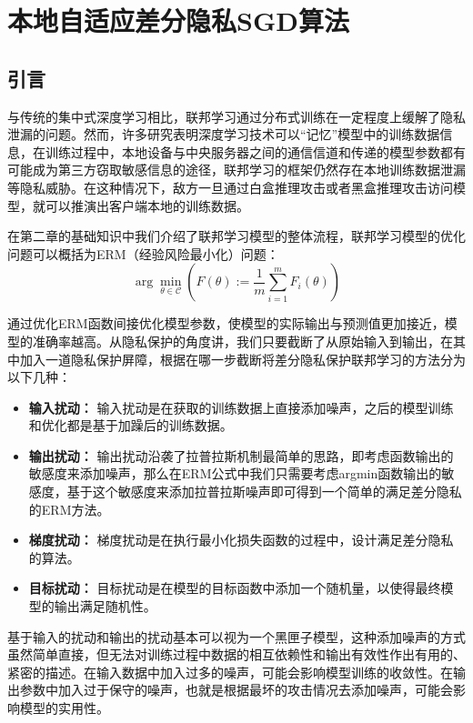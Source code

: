 \chapter{本地自适应差分隐私SGD算法}

\label{ch3}

\section{引言}
与传统的集中式深度学习相比，联邦学习通过分布式训练在一定程度上缓解了隐私泄漏的问题。然而，许多研究表明深度学习技术可以“记忆”模型中的训练数据信息，在训练过程中，本地设备与中央服务器之间的通信信道和传递的模型参数都有可能成为第三方窃取敏感信息的途径，联邦学习的框架仍然存在本地训练数据泄漏等隐私威胁。在这种情况下，敌方一旦通过白盒推理攻击或者黑盒推理攻击访问模型，就可以推演出客户端本地的训练数据。

在第二章的基础知识中我们介绍了联邦学习模型的整体流程，联邦学习模型的优化问题可以概括为ERM（经验风险最小化）问题：
\begin{equation}\label{eq:ERM}
\arg \min _{\theta \in \mathcal{C}}\left(F(\theta):=\frac{1}{m} \sum_{i=1}^{m} F_{i}(\theta)\right)
\end{equation}

通过优化ERM函数间接优化模型参数，使模型的实际输出与预测值更加接近，模型的准确率越高。从隐私保护的角度讲，我们只要截断了从原始输入到输出，在其中加入一道隐私保护屏障，根据在哪一步截断将差分隐私保护联邦学习的方法分为以下几种：
\begin{itemize}
	\item \textbf{输入扰动：} 输入扰动是在获取的训练数据上直接添加噪声，之后的模型训练和优化都是基于加躁后的训练数据。
	\item \textbf{输出扰动：} 输出扰动沿袭了拉普拉斯机制最简单的思路，即考虑函数输出的敏感度来添加噪声，那么在ERM公式中我们只需要考虑argmin函数输出的敏感度，基于这个敏感度来添加拉普拉斯噪声即可得到一个简单的满足差分隐私的ERM方法。
	\item \textbf{梯度扰动：} 梯度扰动是在执行最小化损失函数的过程中，设计满足差分隐私的算法。
	\item \textbf{目标扰动：} 目标扰动是在模型的目标函数中添加一个随机量，以使得最终模型的输出满足随机性。
\end{itemize}

基于输入的扰动和输出的扰动基本可以视为一个黑匣子模型，这种添加噪声的方式虽然简单直接，但无法对训练过程中数据的相互依赖性和输出有效性作出有用的、紧密的描述。在输入数据中加入过多的噪声，可能会影响模型训练的收敛性。在输出参数中加入过于保守的噪声，也就是根据最坏的攻击情况去添加噪声，可能会影响模型的实用性。

